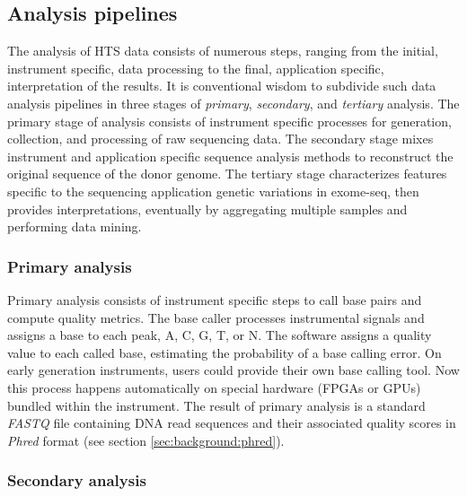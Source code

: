\subsection{Analysis pipelines}

The analysis of HTS data consists of numerous steps, ranging from the initial, instrument specific, data processing to the final, application specific, interpretation of the results.
It is conventional wisdom to subdivide such data analysis pipelines in three stages of \emph{primary}, \emph{secondary}, and \emph{tertiary} analysis.
The primary stage of analysis consists of instrument specific processes for generation, collection, and processing of raw sequencing data.
The secondary stage mixes instrument and application specific sequence analysis methods to reconstruct the original sequence of the donor genome.
The tertiary stage characterizes features specific to the sequencing application \eg genetic variations in exome-seq, then provides interpretations, eventually by aggregating multiple samples and performing data mining.


\subsubsection{Primary analysis}

Primary analysis consists of instrument specific steps to call base pairs and compute quality metrics.
The base caller processes instrumental signals and assigns a base to each peak, \ie A, C, G, T, or N.
The software assigns a quality value to each called base, estimating the probability of a base calling error.
On early generation instruments, users could provide their own base calling tool.
Now this process happens automatically on special hardware (\eg FPGAs or GPUs) bundled within the instrument.
The result of primary analysis is a standard \emph{FASTQ} file containing DNA read sequences and their associated quality scores in \emph{Phred} format (see section \ref{sec:background:phred}).

\subsubsection{Secondary analysis}

